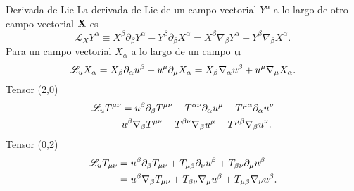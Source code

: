 \begin{definition}{Derivada de Lie}{}
    La derivada de Lie de un campo vectorial $Y^\alpha$ a lo largo de otro campo vectorial $\mathbf{X}$ es
    \begin{equation}
        \mathscr{L}_X Y^\alpha \equiv  X^\beta \partial_\beta Y^\alpha-Y^\beta \partial_\beta X^\alpha= X^\beta \nabla_\beta Y^\alpha  - Y^\beta \nabla_\beta X^\alpha .
    \end{equation}
    Para un campo vectorial $X_\alpha$ a lo largo de un campo $\mathbf{u}$
    \begin{equation}
        \mathscr{L}_u X_\alpha=X_\beta \partial_\alpha u^\beta+u^\mu \partial_\mu X_\alpha =X_\beta \mathbf{\nabla}_\alpha u^\beta+u^\mu \mathbf{\nabla}_\mu X_\alpha.
    \end{equation}
   Tensor (2,0)
    \begin{equation}
        \begin{aligned}
            \mathscr{L}_u T^{\mu \nu} & = u^\beta \partial_\beta T^{\mu \nu}   -  T^{\alpha \nu} \partial_\alpha u^\mu  -T^{\mu \alpha} \partial_\alpha u^\nu \\
         &u^\beta \mathbf{\nabla}_\beta T^{\mu \nu}-T^{\beta \nu}\mathbf{\nabla}_\beta u^\mu - T^{\mu \beta } \mathbf{\nabla}_\beta u^\nu.
        \end{aligned}
    \end{equation}
    Tensor (0,2)
    \begin{equation}
        \begin{aligned}
        \mathscr{L}_u T_{\mu \nu}&= u^\beta \partial_\beta T_{\mu \nu}   +  T_{\mu \beta } \partial_\nu u^\beta  + T_{ \beta \nu} \partial_\mu u^\beta\\
        & = u^\beta \mathbf{\nabla}_\beta T_{\mu \nu}+T_{\beta \nu}\mathbf{\nabla}_\mu u^\beta +T_{\mu \beta } \mathbf{\nabla}_\nu u^\beta.    
        \end{aligned}
        \end{equation}
\end{definition}


